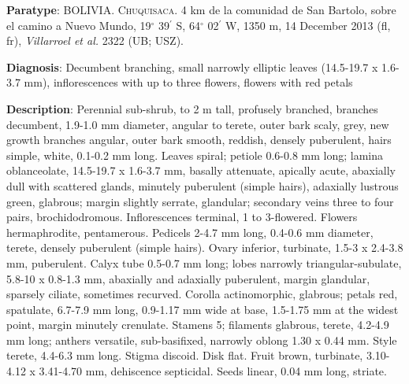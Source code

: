 \documentclass[fleqn,10pt,lineno]{wlpeerj} %
\begin{document}
\textbf{Paratype}: BOLIVIA. \textsc{Chuquisaca}. 4 km de la comunidad de San Bartolo, sobre el camino a Nuevo Mundo, 19$^\circ$ 39$^\prime$ S, 64$^\circ$ 02$^\prime$ W, 1350 m, 14 December 2013 (fl, fr), \textit{Villarroel et al.} 2322 (UB; USZ).

\textbf{Diagnosis}: Decumbent branching, small narrowly elliptic leaves (14.5-19.7 x 1.6-3.7 mm), inflorescences with up to three flowers, flowers with red petals

\textbf{Description}: Perennial sub-shrub, to 2 m tall, profusely branched, branches decumbent, 1.9-1.0 mm diameter, angular to terete, outer bark scaly, grey, new growth branches angular, outer bark smooth, reddish, densely puberulent, hairs simple, white, 0.1-0.2 mm long. Leaves spiral; petiole 0.6-0.8 mm long; lamina oblanceolate, 14.5-19.7 x 1.6-3.7 mm, basally attenuate, apically acute, abaxially dull with scattered glands, minutely puberulent (simple hairs), adaxially  lustrous green, glabrous; margin slightly serrate, glandular; secondary veins three to four pairs, brochidodromous. Inflorescences terminal, 1 to 3-flowered. Flowers hermaphrodite, pentamerous. Pedicels 2-4.7 mm long, 0.4-0.6 mm diameter, terete, densely puberulent (simple hairs). Ovary inferior, turbinate, 1.5-3 x 2.4-3.8 mm, puberulent. Calyx tube 0.5-0.7 mm long; lobes narrowly triangular-subulate, 5.8-10 x 0.8-1.3 mm, abaxially and adaxially puberulent, margin glandular, sparsely ciliate, sometimes recurved. Corolla actinomorphic, glabrous; petals red, spatulate, 6.7-7.9 mm long, 0.9-1.17 mm wide at base, 1.5-1.75 mm at the widest point, margin minutely crenulate. Stamens 5; filaments glabrous, terete, 4.2-4.9 mm long; anthers versatile, sub-basifixed, narrowly oblong 1.30 x 0.44 mm. Style terete, 4.4-6.3 mm long. Stigma discoid. Disk flat. Fruit brown, turbinate, 3.10-4.12 x 3.41-4.70 mm, dehiscence septicidal. Seeds linear, 0.04 mm long, striate.
\end{document}
